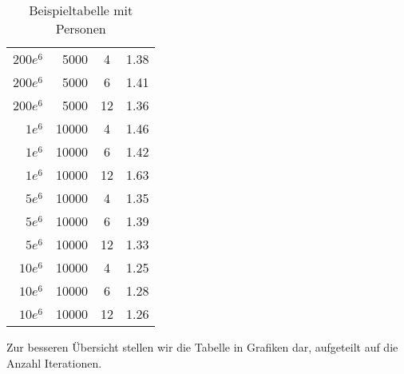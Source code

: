 \begin{table}
\begin{tabular}{r r c l}
		$200e^6$ & 5000 & 4 & 1.38\\
		$200e^6$ & 5000 & 6 & 1.41\\
		$200e^6$ & 5000 & 12 & 1.36\\
		
		$1e^6$ & 10000 & 4  & 1.46 \\
		$1e^6$ & 10000 & 6  & 1.42 \\
		$1e^6$ & 10000 & 12  & 1.63\\
		
		$5e^6$ & 10000 & 4  & 1.35 \\
		$5e^6$ & 10000 & 6  & 1.39 \\
		$5e^6$ & 10000 & 12  & 1.33\\
		
		$10e^6$ & 10000 & 4  & 1.25 \\
		$10e^6$ & 10000 & 6  & 1.28 \\
		$10e^6$ & 10000 & 12  & 1.26\\
		
	\end{tabular}
	\caption{Beispieltabelle mit Personen}
\end{table}

Zur besseren Übersicht stellen wir die Tabelle in Grafiken dar, aufgeteilt auf die Anzahl Iterationen.
	
	
